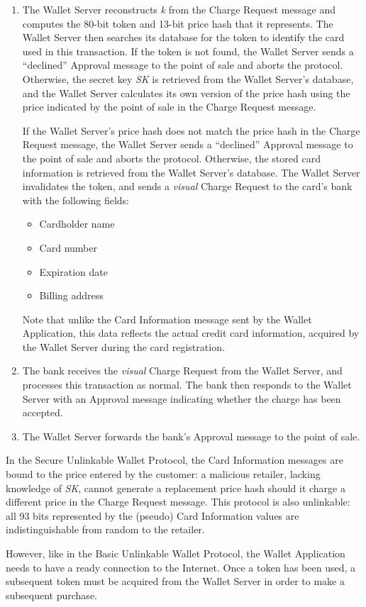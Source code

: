 \begin{enumerate}
\item The Wallet Server reconstructs \emph{k} from the Charge Request message and computes the 80-bit token and 13-bit price hash that it represents.
    The Wallet Server then searches its database for the token to identify the card used in this transaction.
    If the token is not found, the Wallet Server sends a ``declined'' Approval message to the point of sale and aborts the protocol.
    Otherwise, the secret key \emph{SK} is retrieved from the Wallet Server's database, and the Wallet Server calculates its own version of the price hash
        using the price indicated by the point of sale in the Charge Request message.

    If the Wallet Server's price hash does not match the price hash in the Charge Request message,
        the Wallet Server sends a ``declined'' Approval message to the point of sale and aborts the protocol.
    Otherwise, the stored card information is retrieved from the Wallet Server's database.
    The Wallet Server invalidates the token, and sends a \emph{visual} Charge Request to the card's bank with the following fields:
    \begin{itemize}
    \item Cardholder name
    \item Card number
    \item Expiration date
    \item Billing address
    \end{itemize}
    Note that unlike the Card Information message sent by the Wallet Application, this data reflects the actual credit card information,
        acquired by the Wallet Server during the card registration.

\item The bank receives the \emph{visual} Charge Request from the Wallet Server, and processes this transaction as normal.
    The bank then responds to the Wallet Server with an Approval message indicating whether the charge has been accepted.

\item The Wallet Server forwards the bank's Approval message to the point of sale.
\end{enumerate}

In the Secure Unlinkable Wallet Protocol, the Card Information messages are bound to the price entered by the customer:
    a malicious retailer, lacking knowledge of \emph{SK}, cannot generate a replacement price hash should it charge a different price in the Charge Request message.
This protocol is also unlinkable: all 93 bits represented by the (pseudo) Card Information values are indistinguishable from random to the retailer.

However, like in the Basic Unlinkable Wallet Protocol, the Wallet Application needs to have a ready connection to the Internet.
Once a token has been used, a subsequent token must be acquired from the Wallet Server in order to make a subsequent purchase.